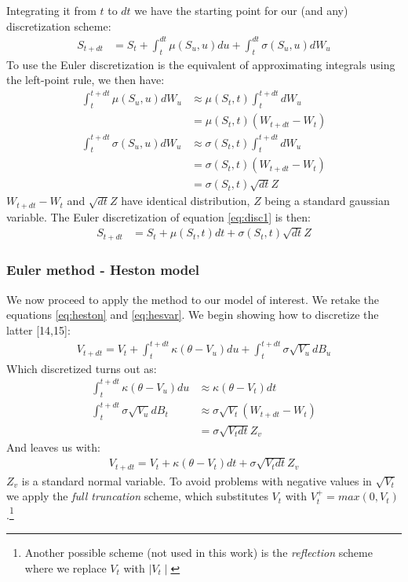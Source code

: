 \documentclass[12pt,twoside]{reedthesis}
\theoremstyle{definition}
\theoremstyle{definition}
\theoremstyle{remark}
\begin{document}
  Integrating it from \(t\) to \(dt\) we have the starting point for our
  (and any) discretization scheme:
  \begin{align}
  \label{eq:disc1}
  S_{t+dt} &= S_t + \int_{t}^{dt}{\mu(S_u,u)}du + \int_{t}^{dt}{\sigma(S_u,u)} dW_u
  \end{align}
  To use the Euler discretization is the equivalent of approximating
  integrals using the left-point rule, we then have:
  \begin{align*}
   \int_{t}^{t+dt}{\mu(S_u,u)} dW_u &\approx \mu(S_t,t) \int_{t}^{t+dt}dW_u\\
  &= \mu(S_t,t) (W_{t+dt} - W_t)  \\
   \int_{t}^{t+dt}{\sigma(S_u,u)} dW_u &\approx \sigma(S_t,t) \int_{t}^{t+dt}dW_u\\
  &= \sigma(S_t,t) (W_{t+dt} - W_t)  \\
  &= \sigma(S_t,t) \sqrt{dt} Z
  \end{align*}
  \(W_{t+dt}-W_t\) and \(\sqrt{dt}Z\) have identical distribution, \(Z\)
  being a standard gaussian variable. The Euler discretization of equation
  \eqref{eq:disc1} is then:
  \begin{align}
  \label{eq:disc2}
  S_{t+dt} &= S_t + \mu(S_t,t)dt + \sigma(S_t,t)\sqrt{dt}Z
  \end{align}
  \subsubsection{Euler method - Heston
  model}\label{euler-method---heston-model}
  
  We now proceed to apply the method to our model of interest. We retake
  the equations \eqref{eq:heston} and \eqref{eq:hesvar}. We begin showing how
  to discretize the latter {[}14,15{]}:
  \begin{align}
  \label{eq:hesvareuler}
  V_{t+dt} = V_t+ \int_{t}^{t+dt}{\kappa (\theta - V_u) du} + \int_{t}^{t+dt}{\sigma \sqrt{V_u} dB_u}
  \end{align}
  Which discretized turns out as:
  \begin{align*}
   \int_{t}^{t+dt}{\kappa (\theta - V_u)} du &\approx \kappa (\theta - V_t) dt\\
   \int_{t}^{t+dt}{\sigma \sqrt{V_u}} dB_t &\approx \sigma \sqrt{V_t} (W_{t+dt}-W_t)\\
  &= \sigma \sqrt{V_t dt} Z_v
  \end{align*}
  And leaves us with:
  \begin{align}
  V_{t+dt} = V_t + \kappa (\theta - V_t) dt + \sigma \sqrt{V_t dt} Z_v
  \end{align}
  \(Z_v\) is a standard normal variable. To avoid problems with negative
  values in \(\sqrt{V_t}\) we apply the \emph{full truncation} scheme,
  which substitutes \(V_t\) with \(V_t^+ = max(0, V_t)\).\footnote{Another
    possible scheme (not used in this work) is the \emph{reflection}
    scheme where we replace \(V_t\) with \(\mid V_t \mid\)}
  
\end{document}
